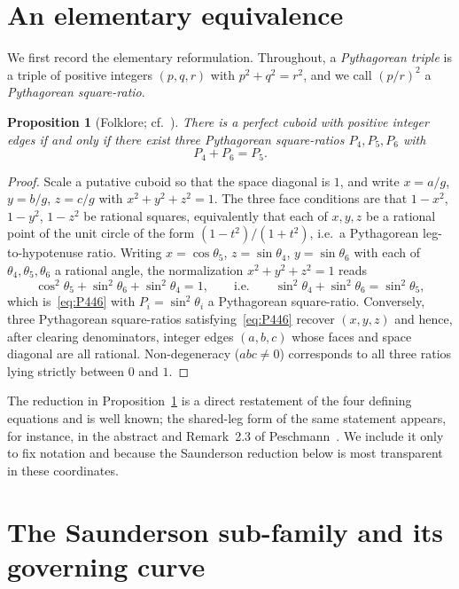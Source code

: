 \documentclass[11pt,reqno]{amsart}
\theoremstyle{plain}
\newtheorem{proposition}{Proposition}
\theoremstyle{definition}
\begin{document}
\section{An elementary equivalence}\label{sec:reformulation}

We first record the elementary reformulation. Throughout, a \emph{Pythagorean
triple} is a triple of positive integers $(p,q,r)$ with $p^2+q^2=r^2$, and we
call $(p/r)^2$ a \emph{Pythagorean square-ratio}.

\begin{proposition}[Folklore; cf.\ \cite{Guy,Peschmann1}]\label{prop:reformulation}
There is a perfect cuboid with positive integer edges if and only if there
exist three Pythagorean square-ratios $P_4,P_5,P_6$ with
\begin{equation}\label{eq:P446}
   P_4+P_6=P_5 .
\end{equation}
\end{proposition}

\begin{proof}
Scale a putative cuboid so that the space diagonal is $1$, and write
$x=a/g$, $y=b/g$, $z=c/g$ with $x^2+y^2+z^2=1$. The three face conditions are
that $1-x^2$, $1-y^2$, $1-z^2$ be rational squares, equivalently that each of
$x,y,z$ be a rational point of the unit circle of the form
$(1-t^2)/(1+t^2)$, i.e.\ a Pythagorean leg-to-hypotenuse ratio. Writing
$x=\cos\theta_5$, $z=\sin\theta_4$, $y=\sin\theta_6$ with each of
$\theta_4,\theta_5,\theta_6$ a rational angle, the normalization
$x^2+y^2+z^2=1$ reads
\[
   \cos^2\theta_5+\sin^2\theta_6+\sin^2\theta_4=1,
   \qquad\text{i.e.}\qquad
   \sin^2\theta_4+\sin^2\theta_6=\sin^2\theta_5,
\]
which is~\eqref{eq:P446} with $P_i=\sin^2\theta_i$ a Pythagorean square-ratio.
Conversely, three Pythagorean square-ratios satisfying~\eqref{eq:P446} recover
$(x,y,z)$ and hence, after clearing denominators, integer edges $(a,b,c)$ whose
faces and space diagonal are all rational. Non-degeneracy ($abc\neq0$)
corresponds to all three ratios lying strictly between $0$ and $1$.
\end{proof}

The reduction in Proposition~\ref{prop:reformulation} is a direct restatement
of the four defining equations and is well known; the shared-leg form of the
same statement appears, for instance, in the abstract and Remark~2.3 of
Peschmann~\cite{Peschmann1}. We include it only to fix notation and because the
Saunderson reduction below is most transparent in these coordinates.

\section{The Saunderson sub-family and its governing curve}\label{sec:saunderson}
\end{document}
